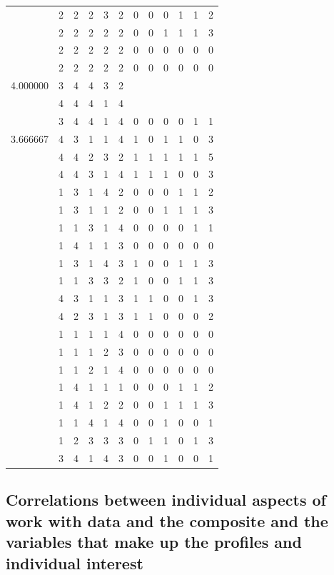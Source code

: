 \documentclass[]{book}
\theoremstyle{definition}
\theoremstyle{definition}
\theoremstyle{definition}
\theoremstyle{remark}
\begin{document}
\begin{table}
{\begin{tabular}[t]{rrrrrrrrrrrr}
 & 2 & 2 & 2 & 3 & 2 & 0 & 0 & 0 & 1 & 1 & 2\\
 & 2 & 2 & 2 & 2 & 2 & 0 & 0 & 1 & 1 & 1 & 3\\
 & 2 & 2 & 2 & 2 & 2 & 0 & 0 & 0 & 0 & 0 & 0\\
 & 2 & 2 & 2 & 2 & 2 & 0 & 0 & 0 & 0 & 0 & 0\\
4.000000 & 3 & 4 & 4 & 3 & 2 &  &  &  &  &  & \\
 & 4 & 4 & 4 & 1 & 4 &  &  &  &  &  & \\
 & 3 & 4 & 4 & 1 & 4 & 0 & 0 & 0 & 0 & 1 & 1\\
3.666667 & 4 & 3 & 1 & 1 & 4 & 1 & 0 & 1 & 1 & 0 & 3\\
 & 4 & 4 & 2 & 3 & 2 & 1 & 1 & 1 & 1 & 1 & 5\\
 & 4 & 4 & 3 & 1 & 4 & 1 & 1 & 1 & 0 & 0 & 3\\
 & 1 & 3 & 1 & 4 & 2 & 0 & 0 & 0 & 1 & 1 & 2\\
 & 1 & 3 & 1 & 1 & 2 & 0 & 0 & 1 & 1 & 1 & 3\\
 & 1 & 1 & 3 & 1 & 4 & 0 & 0 & 0 & 0 & 1 & 1\\
 & 1 & 4 & 1 & 1 & 3 & 0 & 0 & 0 & 0 & 0 & 0\\
 & 1 & 3 & 1 & 4 & 3 & 1 & 0 & 0 & 1 & 1 & 3\\
 & 1 & 1 & 3 & 3 & 2 & 1 & 0 & 0 & 1 & 1 & 3\\
 & 4 & 3 & 1 & 1 & 3 & 1 & 1 & 0 & 0 & 1 & 3\\
 & 4 & 2 & 3 & 1 & 3 & 1 & 1 & 0 & 0 & 0 & 2\\
 & 1 & 1 & 1 & 1 & 4 & 0 & 0 & 0 & 0 & 0 & 0\\
 & 1 & 1 & 1 & 2 & 3 & 0 & 0 & 0 & 0 & 0 & 0\\
 & 1 & 1 & 2 & 1 & 4 & 0 & 0 & 0 & 0 & 0 & 0\\
 & 1 & 4 & 1 & 1 & 1 & 0 & 0 & 0 & 1 & 1 & 2\\
 & 1 & 4 & 1 & 2 & 2 & 0 & 0 & 1 & 1 & 1 & 3\\
 & 1 & 1 & 4 & 1 & 4 & 0 & 0 & 1 & 0 & 0 & 1\\
 & 1 & 2 & 3 & 3 & 3 & 0 & 1 & 1 & 0 & 1 & 3\\
 & 3 & 4 & 1 & 4 & 3 & 0 & 0 & 1 & 0 & 0 & 1\\
\bottomrule
\end{tabular}}
\end{table}

\subsection{Correlations between individual aspects of work with data
and the composite and the variables that make up the profiles and
individual
interest}\label{correlations-between-individual-aspects-of-work-with-data-and-the-composite-and-the-variables-that-make-up-the-profiles-and-individual-interest}
\end{document}
